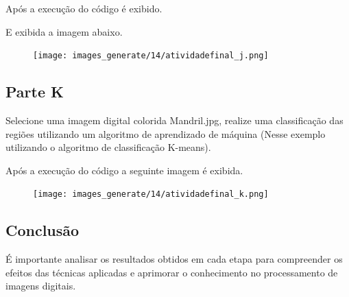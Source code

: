 \documentclass[10pt,a4paper]{article}
\begin{document}


Após a execução do código é exibido.




E exibida a imagem abaixo.

\begin{figure}[H]
    \centering
    {{\texttt{[image: images\_generate/14/atividadefinal\_j.png]}}}
\end{figure}


\subsection{Parte K}

Selecione uma imagem digital colorida Mandril.jpg, realize uma classificação das regiões utilizando um algoritmo de aprendizado de máquina (Nesse exemplo utilizando o algoritmo de classificação K-means).



Após a execução do código a seguinte imagem é exibida.

\begin{figure}[H]
    \centering
    {{\texttt{[image: images\_generate/14/atividadefinal\_k.png]}}}
\end{figure}


\subsection{Conclusão}

É importante analisar os resultados obtidos em cada etapa para compreender os efeitos das técnicas aplicadas e aprimorar o conhecimento no processamento de imagens digitais.
\end{document}
